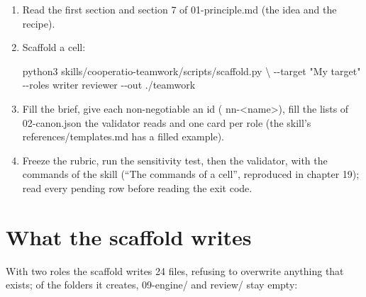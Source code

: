 \documentclass[
  american,
  10pt,
]{report}
\newenvironment{Shaded}{\begin{snugshade}}{\end{snugshade}}
\newcommand{\AttributeTok}[1]{\textcolor[rgb]{0.13,0.29,0.53}{#1}}
\newcommand{\DataTypeTok}[1]{\textcolor[rgb]{0.13,0.29,0.53}{#1}}
\newcommand{\ExtensionTok}[1]{#1}
\newcommand{\NormalTok}[1]{#1}
\newcommand{\StringTok}[1]{\textcolor[rgb]{0.31,0.60,0.02}{#1}}
\renewenvironment{Shaded}{%
  \def\FrameCommand{{\color{rulecolor}\vrule width 2pt}\hspace{6pt}\colorbox{shadecolor}}%
  \MakeFramed{\advance\hsize-\width\FrameRestore}\small}%
  {\endMakeFramed}
\renewcommand{\texttt}[1]{{\ttfamily\hyphenchar\font=-1 #1}}
\begin{document}
\begin{enumerate}
\def\labelenumi{\arabic{enumi}.}
\item
  Read the first section and section 7 of
  \texttt{01-\allowbreak{}principle.\allowbreak{}md} (the idea and the
  recipe).
\item
  Scaffold a cell:

\begin{Shaded}
\begin{Highlighting}[]
\ExtensionTok{python3}\NormalTok{ skills/cooperatio{-}teamwork/scripts/scaffold.py }\DataTypeTok{\textbackslash{}}
    \AttributeTok{{-}{-}target} \StringTok{"My target"} \AttributeTok{{-}{-}roles}\NormalTok{ writer reviewer }\AttributeTok{{-}{-}out}\NormalTok{ ./teamwork}
\end{Highlighting}
\end{Shaded}
\item
  Fill the brief, give each non-negotiable an id
  (\texttt{nn-\allowbreak{}<name>}), fill the lists of
  \texttt{02-\allowbreak{}canon.\allowbreak{}json} the validator reads
  and one card per role (the skill's
  \texttt{references/\allowbreak{}templates.\allowbreak{}md} has a
  filled example).
\item
  Freeze the rubric, run the sensitivity test, then the validator, with
  the commands of the skill (``The commands of a cell'', reproduced in
  chapter 19); read every pending row before reading the exit code.
\end{enumerate}

\section{What the scaffold writes}\label{what-the-scaffold-writes}

With two roles the scaffold writes 24 files, refusing to overwrite
anything that exists; of the folders it creates,
\texttt{09-\allowbreak{}engine/\allowbreak{}} and
\texttt{review/\allowbreak{}} stay empty:
\end{document}

